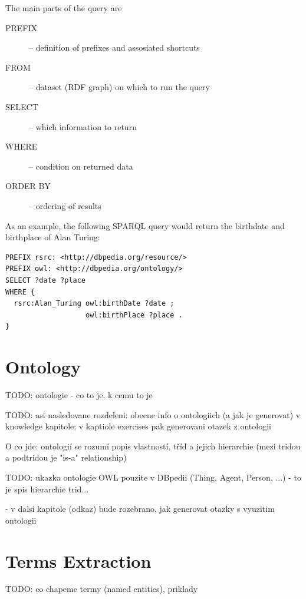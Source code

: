 \documentclass[a4paper, 12pt, twoside]{fithesis2}		%
\renewcommand{\_}{\leavevmode \kern0.0em\vbox{\hrule width0.4em}}
\begin{document}
The main parts of the query are
\begin{description}
  \item[PREFIX] -- definition of prefixes and assosiated shortcuts
  \item[FROM] -- dataset (RDF graph) on which to run the query
  \item[SELECT] -- which information to return
  \item[WHERE] -- condition on returned data
  \item[ORDER BY] -- ordering of results
\end{description}

As an example, the following SPARQL query would return the birthdate and birthplace of Alan Turing:

\begin{lstlisting}
PREFIX rsrc: <http://dbpedia.org/resource/>
PREFIX owl: <http://dbpedia.org/ontology/>
SELECT ?date ?place
WHERE {
  rsrc:Alan_Turing owl:birthDate ?date ;
                   owl:birthPlace ?place .
}
\end{lstlisting}

\section{Ontology}
\label{sec:ontology}

TODO: ontologie - co to je, k cemu to je

TODO: asi nasledovane rozdeleni: obecne info o ontologiich (a jak je generovat) v knowledge kapitole; v kaptiole exercises pak generovani otazek z ontologii

O co jde: ontologií se rozumí popis vlastností, tříd a jejich hierarchie
(mezi tridou a podtridou je "is-a" relationship)

TODO: ukazka ontologie OWL pouzite v DBpedii (Thing, Agent, Person, ...) - to je spis hierarchie trid...

- v dalsi kapitole (odkaz) bude rozebrano, jak generovat otazky s vyuzitim ontologii


\section{Terms Extraction}
\label{sec:terms-extraction}

TODO: co chapeme termy (named entities), priklady
\end{document}
